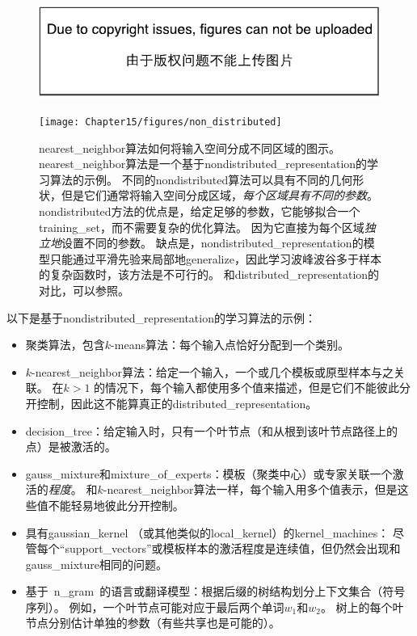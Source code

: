 \begin{figure}[!htb]
\ifOpenSource
\centerline{\includegraphics{figure.pdf}}
\else
\centerline{\texttt{[image: Chapter15/figures/non\_distributed]}}
\fi
\caption{\gls{nearest_neighbor}算法如何将输入空间分成不同区域的图示。
\gls{nearest_neighbor}算法是一个基于\gls{nondistributed_representation}的学习算法的示例。
不同的\gls{nondistributed}算法可以具有不同的几何形状，但是它们通常将输入空间分成区域，\emph{每个区域具有不同的参数}。
\gls{nondistributed}方法的优点是，给定足够的参数，它能够拟合一个\gls{training_set}，而不需要复杂的优化算法。
因为它直接为每个区域\emph{独立地}设置不同的参数。
缺点是，\gls{nondistributed_representation}的模型只能通过平滑先验来局部地\gls{generalize}，因此学习波峰波谷多于样本的复杂函数时，该方法是不可行的。
和\gls{distributed_representation}的对比，可以参照。
}
\label{fig:chap15_nondistributed}
\end{figure}




以下是基于\gls{nondistributed_representation}的学习算法的示例：
\begin{itemize}
	\item 聚类算法，包含$k$-means算法：每个输入点恰好分配到一个类别。

	\item $k$-\gls{nearest_neighbor}算法：给定一个输入，一个或几个模板或原型样本与之关联。
	在$k >  1$ 的情况下，每个输入都使用多个值来描述，但是它们不能彼此分开控制，因此这不能算真正的\gls{distributed_representation}。

	\item \gls{decision_tree}：给定输入时，只有一个叶节点（和从根到该叶节点路径上的点）是被激活的。

	\item \gls{gauss_mixture}和\gls{mixture_of_experts}：模板（聚类中心）或专家关联一个激活的\emph{程度}。
	和$k$-\gls{nearest_neighbor}算法一样，每个输入用多个值表示，但是这些值不能轻易地彼此分开控制。

	\item 具有\gls{gaussian_kernel} （或其他类似的\gls{local_kernel}）的\gls{kernel_machines}： 尽管每个``\gls{support_vectors}''或模板样本的激活程度是连续值，但仍然会出现和\gls{gauss_mixture}相同的问题。


	\item 基于~\gls{n_gram}~的语言或翻译模型：根据后缀的树结构划分上下文集合（符号序列）。
	例如，一个叶节点可能对应于最后两个单词$w_1$和$w_2$。
	树上的每个叶节点分别估计单独的参数（有些共享也是可能的）。
\end{itemize}

